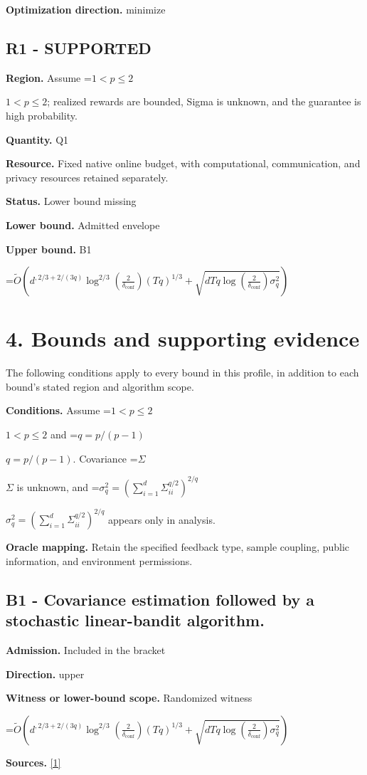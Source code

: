 \documentclass[10pt,a4paper]{article}
\newcommand{\AtlasMath}[1]{\par\begingroup\centering\setbox0=\hbox{$\displaystyle #1$}\ifdim\wd0>1.4\linewidth\typeout{ATLAS WIDE FORMULA: \the\wd0}\fi\ifdim\wd0>\linewidth\resizebox{\linewidth}{!}{\box0}\else\box0\fi\par\endgroup}
\newcommand{\AtlasInlineMath}[1]{\begingroup\setbox0=\hbox{$#1$}\ifdim\wd0>.4\linewidth\endgroup\AtlasMath{#1}\else\endgroup$#1$\fi}
\begin{document}
\textbf{Optimization direction.} minimize

\subsection{R1 - SUPPORTED}
\textbf{Region.} Assume \AtlasInlineMath{1<p\le 2}; realized rewards are bounded, Sigma is unknown, and the guarantee is high probability.

\textbf{Quantity.} Q1

\textbf{Resource.} Fixed native online budget, with computational, communication, and privacy resources retained separately.

\textbf{Status.} Lower bound missing

\textbf{Lower bound.} Admitted envelope

\textbf{Upper bound.} B1

\AtlasMath{\widetilde{O}\!\left(d^{,2/3+2/(3q)}\log^{2/3}\!\left(\frac2{\delta_{\mathrm{conf}}}\right)(Tq)^{1/3}+\sqrt{dTq\log\!\left(\frac2{\delta_{\mathrm{conf}}}\right)\sigma_q^2}\right)}
\section{4. Bounds and supporting evidence}
The following conditions apply to every bound in this profile, in addition to each bound's stated region and algorithm scope.

\textbf{Conditions.} Assume \AtlasInlineMath{1<p\le2} and \AtlasInlineMath{q=p/(p-1)}. Covariance \AtlasInlineMath{\Sigma} is unknown, and \AtlasInlineMath{\sigma_q^2=(\sum_{i=1}^d\Sigma_{ii}^{q/2})^{2/q}} appears only in analysis.

\textbf{Oracle mapping.} Retain the specified feedback type, sample coupling, public information, and environment permissions.

\subsection{B1 - Covariance estimation followed by a stochastic linear-bandit algorithm.}
\textbf{Admission.} Included in the bracket

\textbf{Direction.} upper

\textbf{Witness or lower-bound scope.} Randomized witness

\AtlasMath{\widetilde{O}\!\left(d^{,2/3+2/(3q)}\log^{2/3}\!\left(\frac2{\delta_{\mathrm{conf}}}\right)(Tq)^{1/3}+\sqrt{dTq\log\!\left(\frac2{\delta_{\mathrm{conf}}}\right)\sigma_q^2}\right)}
\textbf{Sources.} \href{https://raw.githubusercontent.com/mlresearch/v306/main/assets/ezer26a/ezer26a.pdf}{[1]}
\end{document}
